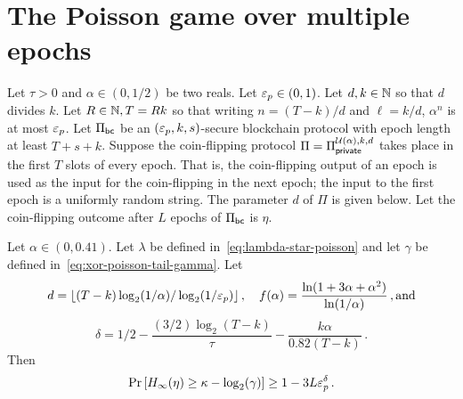 \section{The Poisson game over multiple epochs}




Let $\tau > 0$ and $\alpha \in (0, 1/2)$ be two reals. 
Let $\mathsf{\varepsilon}_p \in (0, 1)$. 
Let $d, k \in \mathbb{N}$ 
so that $d$ divides $k$. 
Let $R \in \mathbb{N}, T = Rk$ so that 
writing $n = (T - k)/d$ and $\ell = k/d$, 
$\alpha^n$ is at most $\mathsf{\varepsilon}_p$. 
Let $\Pi_\mathsf{bc}$ be an $(\mathsf{\varepsilon}_p, k, s)$-secure blockchain protocol 
with epoch length at least $T + s + k$. 
Suppose the	coin-flipping protocol $\Pi = \Pi_\mathsf{private}^{\mathcal{U}(\alpha),k,d}$ 
takes place in the first $T$ slots of every epoch. 
That is, the coin-flipping output of an epoch is used 
as the input for the coin-flipping in the next epoch; 
the input to the first epoch is a uniformly random string. 
The parameter $d$ of $\Pi$ is given below.
Let the coin-flipping outcome after $L$ epochs of $\Pi_\mathsf{bc}$ is $\eta$.

\begin{theorem}\label{thm:beacon-poisson}
	Let $\alpha \in (0, 0.41)$. 
	Let $\lambda$ be defined in~\eqref{eq:lambda-star-poisson} and 
	let $\gamma$ be defined in~\eqref{eq:xor-poisson-tail-gamma}. 
	Let 
	$$
			d = \lfloor (T - k) \log_2(1/\alpha)/\log_2(1/\mathsf{\varepsilon}_p)\rfloor
			\,,\quad
			f(\alpha) = \frac{\ln(1 + 3 \alpha + \alpha^2)}{\ln(1/\alpha)}
			\,,\text{and}
	$$
	\begin{equation}\label{eq:delta-prob-loss-multiepoch}
		\delta 
		= 
			1/2 - \frac{(3/2) \log_2(T - k)}{\tau} 
			- \frac{k \alpha}{0.82 (T - k)}
      \,.
	\end{equation}
	Then 
	$$
		\Pr\left[H_\infty(\eta) \geq \kappa - \log_2(\gamma)\right] \geq 1 -  3 L \mathsf{\varepsilon}_p^\delta
		\,.
	$$
\end{theorem}


